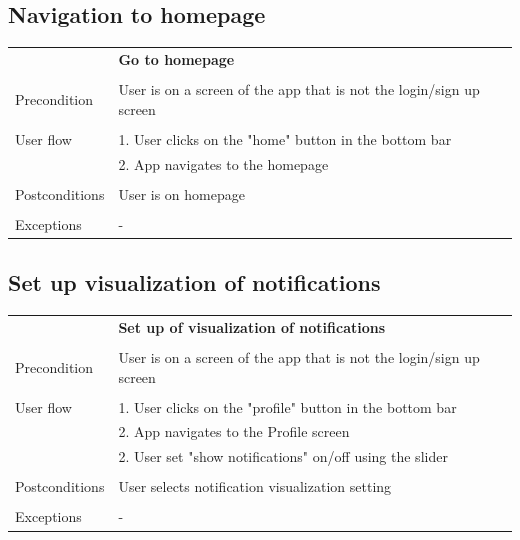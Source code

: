 \documentclass[10pt]{article}
\begin{document}
    \subsection{Navigation to homepage}
    \begin{tabular}{ p{3cm}|p{8cm} }
     & \textbf{Go to homepage} \\
     \\
     Precondition & User is on a screen of the app that is not the login/sign up screen \\ 
     \\
     User flow 
     & 1. User clicks on the "home" button in the bottom bar  \\
     & 2. App navigates to the homepage \\ 
     \\
     Postconditions & User is on homepage \\
     \\
     Exceptions & -\\
    \end{tabular}
    \newline
    \newline
    \newline
    \subsection{Set up visualization of notifications}
    \begin{tabular}{ p{3cm}|p{8cm} }
     & \textbf{Set up of visualization of notifications} \\
     \\
     Precondition & User is on a screen of the app that is not the login/sign up screen \\ 
     \\
     User flow 
     & 1. User clicks on the "profile" button in the bottom bar  \\
     & 2. App navigates to the Profile screen \\ 
     & 2. User set "show notifications" on/off using the slider \\ 
     \\
     Postconditions & User selects notification visualization  setting \\
     \\
     Exceptions & -\\
    \end{tabular}
    \newline
    \newline
    \newline
\end{document}
